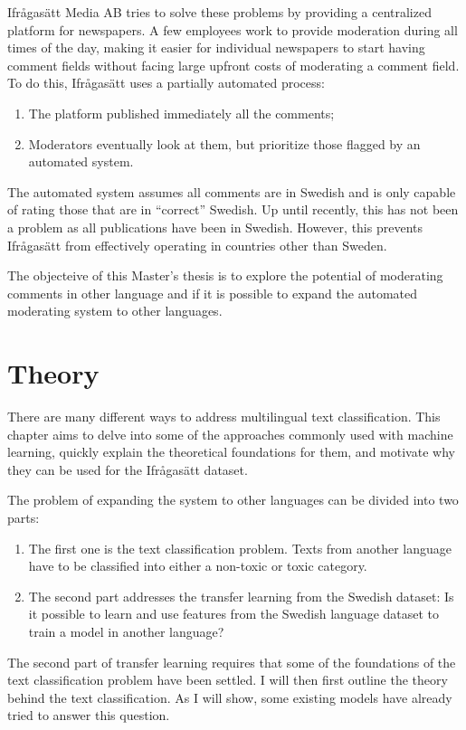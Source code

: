 \documentclass[nofilelist]{cslthse-msc}
\begin{document}
Ifrågasätt Media AB tries to solve these problems by providing a centralized platform for newspapers. A few employees work to provide moderation during all times of the day, making it easier for individual newspapers to start having comment fields without facing large upfront costs of moderating a comment field. To do this, Ifrågasätt uses a partially automated process:
\begin{enumerate}
    \item The platform published immediately all the comments;
    \item  Moderators eventually look at them, but prioritize those flagged by an automated system.
\end{enumerate}

The automated system assumes all comments are in Swedish and is only capable of rating those that are in ``correct'' Swedish. Up until recently, this has not been a problem as all publications have been in Swedish. However, this prevents Ifrågasätt from effectively operating in countries other than Sweden. 

The objecteive of this Master's thesis is to explore the potential of moderating comments in other language and if it is possible to expand the automated moderating system to other languages.


\chapter{Theory}
There are many different ways to address multilingual text classification. This chapter aims to delve into some of the approaches commonly used with machine learning, quickly explain the theoretical foundations for them, and motivate why they can be used for the Ifrågasätt dataset.

The problem of expanding the system to other languages can be divided into two parts:
\begin{enumerate}
    \item The first one is the text classification problem. Texts from another language have to be classified into either a non-toxic or toxic category. 
    \item The second part addresses the transfer learning from the Swedish dataset: Is it possible to learn and use features from the Swedish language dataset to train a model in another language? 
\end{enumerate}

The second part of transfer learning requires that some of the foundations of the text classification problem have been settled. I will then first outline the theory behind the text classification. As I will show, some existing models have already tried to answer this question. 
\end{document}
